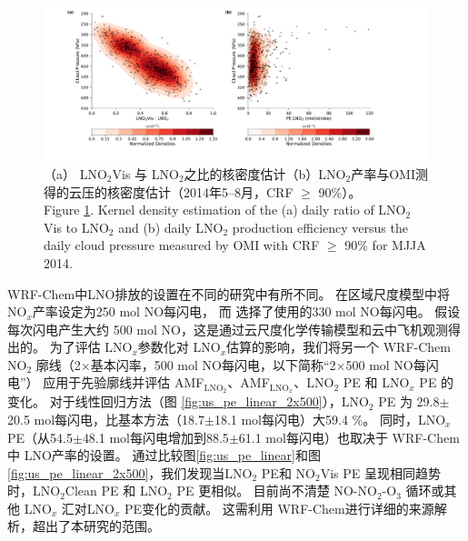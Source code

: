 \begin{figure}[!htbp]
\centering
\includegraphics[width=15cm]{./figures/us_cp_ratio_lno2.pdf}
\caption{（a） LNO$_\textrm{2}$Vis 与 LNO$_\textrm{2}$之比的核密度估计（b）LNO$_\textrm{2}$产率与OMI测得的云压的核密度估计（2014年5--8月，CRF $\geq$ 90\%）。\\
Figure \ref{fig:us_cp_ratio_lno2}. Kernel density estimation of the (a) daily ratio of LNO$_\textrm{2}$Vis to LNO$_\textrm{2}$ and (b) daily LNO$_\textrm{2}$ production efficiency versus the daily cloud pressure measured by OMI with CRF $\geq$ 90\% for MJJA 2014.}
\label{fig:us_cp_ratio_lno2}
\end{figure}


WRF-Chem中LNO排放的设置在不同的研究中有所不同。
\citet{Zhao.2009}在区域尺度模型中将NO$_x$产率设定为250 mol NO每闪电，
而 \citet{Bela.2016}选择了\citet{Barth.2012}使用的330 mol NO每闪电。
\citet{Wang.2015a}假设每次闪电产生大约 500 mol NO，这是通过云尺度化学传输模型和云中飞机观测得出的\citep{Ott.2010}。
为了评估 LNO$_x$参数化对 LNO$_x$估算的影响，我们将另一个 WRF-Chem NO$_2$ 廓线（2$\times$基本闪率，500 mol NO每闪电，以下简称“2$\times$500 mol NO每闪电”）
应用于先验廓线并评估 AMF$_\textrm{LNO$_2$}$、AMF$_\textrm{LNO$_x$}$、LNO$_2$ PE 和 LNO$_x$ PE 的变化。
对于线性回归方法（图 \ref{fig:us_pe_linear_2x500}），LNO$_2$ PE 为 29.8$\pm$20.5 mol每闪电，比基本方法（18.7$\pm$18.1 mol每闪电）大59.4 \%。
同时，LNO$_x$ PE（从54.5$\pm$48.1 mol每闪电增加到88.5$\pm$61.1 mol每闪电）也取决于 WRF-Chem 中 LNO产率的设置。
通过比较图\ref{fig:us_pe_linear}和图\ref{fig:us_pe_linear_2x500}，我们发现当LNO$_2$ PE和 NO$_2$Vis PE 呈现相同趋势时，LNO$_2$Clean PE 和 LNO$_2$ PE 更相似。
目前尚不清楚 NO-NO$_2$-O$_3$ 循环或其他 LNO$_x$ 汇对LNO$_x$ PE变化的贡献。
这需利用 WRF-Chem进行详细的来源解析，超出了本研究的范围。

